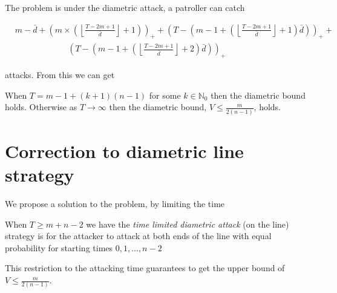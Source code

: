 \documentclass[11pt]{beamer}
\newcommand{\floor}[1]{\left \lfloor #1 \right \rfloor}
\newcommand{\pospart}[1]{\left( #1 \right)_{+}}
\begin{document}
\begin{frame}{\insertsection}

The problem is under the diametric attack, a patroller can catch
\tiny


\begin{align*}
&m-\bar{d}+\pospart{m \times (\floor{\frac{T-2m+1}{\bar{d}}}+1)} +  \pospart{T-(m-1+(\floor{\frac{T-2m+1}{\bar{d}}}+1)\bar{d})} +  \\
&\hspace{75pt} \pospart{T-(m-1+(\floor{\frac{T-2m+1}{\bar{d}}}+2)\bar{d})}
\end{align*}

\normalsize
attacks. From this we can get

\begin{lemma}
When $T=m-1+(k+1)(n-1)$ for some $k \in \mathbb{N}_{0}$ then the diametric bound holds. Otherwise as $T \rightarrow \infty$ then the diametric bound, $V \leq \frac{m}{2(n-1)}$, holds.
\end{lemma}

\end{frame}


\section[]{Correction to diametric line strategy}
\hypertarget{Correction to line graph strategy}{}
\begin{frame}{\insertsection}
We propose a solution to the problem, by limiting the time

\begin{definition}
When $T \geq m+n-2$ we have the \textit{time limited diametric attack} (on the line) strategy is for the attacker to attack at both ends of the line with equal probability for starting times $0,1,...,n-2$
\end{definition}

This restriction to the attacking time guarantees to get the upper bound of $V \leq \frac{m}{2(n-1)}$.
\end{frame}
\end{document}
